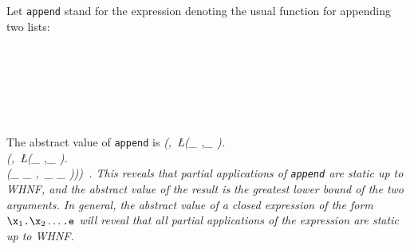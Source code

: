 Let \mbox{\tt append} stand for the expression denoting the usual function for
appending two lists:
\begin{flushleft}
\vspace{-0.0em}\vspace{-0.0em}\\
\vspace{-0.0em}\\
\vspace{-0.0em}\\
\vspace{-0.0em}\\
\vspace{-0.0em}\\
\vspace{-0.0em}
\end{flushleft}
The abstract value of \mbox{\tt append} is
\beqs
\it (\ID,\ \L(\A_{ },\K_{ }).\\
\it (\ID,\ \L(\A_{ },\K_{ }).\\
\it (\A_{ }\glb\A_{ },\ \K_{ }\glb\K_{ })))\ .
\eeqs
This reveals that partial applications of \mbox{\tt append} are static up to WHNF, and the
abstract value of the result is the greatest lower bound of the two
arguments.  In general, the abstract value of a closed expression
of the form $\mbox{\tt {\char'134}x}_1\mbox{\tt .{\char'134}x}_2\ldots\mbox{\tt .e}$ will reveal that all partial
applications of the expression are static up to WHNF.




